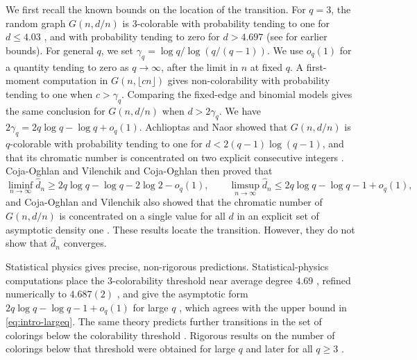 We first recall the known bounds on the location of the transition. For $q = 3$, the random graph $G(n, d/n)$ is $3$-colorable with probability tending to one for $d \le 4.03$ \cite[Corollary~2]{achlioptas2003almost}, and with probability tending to zero for $d > 4.697$ \cite[Section~1.3]{ayre2022lower} (see \cite{chvatal1991almost,achlioptas1997analysis,kaporis2000note,dubois2002noncolourability} for earlier bounds). For general $q$, we set $\gamma_q = \log q / \log(q/(q - 1))$. We use $o_q(1)$ for a quantity tending to zero as $q \to \infty$, after the limit in $n$ at fixed $q$. A first-moment computation in $G(n, \lfloor cn \rfloor)$ gives non-colorability with probability tending to one when $c > \gamma_q$. Comparing the fixed-edge and binomial models gives the same conclusion for $G(n, d/n)$ when $d > 2\gamma_q$. We have $2\gamma_q = 2q \log q - \log q + o_q(1)$. Achlioptas and Naor showed that $G(n, d/n)$ is $q$-colorable with probability tending to one for $d < 2(q - 1) \log(q - 1)$, and that its chromatic number is concentrated on two explicit consecutive integers \cite[Theorem~1]{achlioptas2005two}. Coja-Oghlan and Vilenchik \cite[Theorem~1.1]{cojaoghlan2016chromatica} and Coja-Oghlan \cite[Theorem~1]{cojaoghlan2013upper} then proved that
\begin{equation}\label{eq:intro-largeq}
\liminf_{n \to \infty} \hat d_n \ge 2q \log q - \log q - 2 \log 2 - o_q(1), \qquad \limsup_{n \to \infty} \hat d_n \le 2q \log q - \log q - 1 + o_q(1),
\end{equation}
and Coja-Oghlan and Vilenchik also showed that the chromatic number of $G(n, d/n)$ is concentrated on a single value for all $d$ in an explicit set of asymptotic density one \cite[Theorem~1.2]{cojaoghlan2016chromatica}. These results locate the transition. However, they do not show that $\hat d_n$ converges.

Statistical physics gives precise, non-rigorous predictions. Statistical-physics computations place the $3$-colorability threshold near average degree $4.69$ \cite{mulet2002coloring}, refined numerically to $4.687(2)$ \cite[Table~II]{zdeborova2007phase}, and give the asymptotic form $2q \log q - \log q - 1 + o_q(1)$ for large $q$ \cite{krzakala2004threshold}, which agrees with the upper bound in \eqref{eq:intro-largeq}. The same theory predicts further transitions in the set of colorings below the colorability threshold \cite{krzakala2007gibbs,zdeborova2007phase}. Rigorous results on the number of colorings below that threshold were obtained for large $q$ \cite[Theorem~2.1]{bapst2016condensation} and later for all $q \ge 3$ \cite[arXiv:1611.00814v4, Theorem~1.2]{cojaoghlan2018information}.

